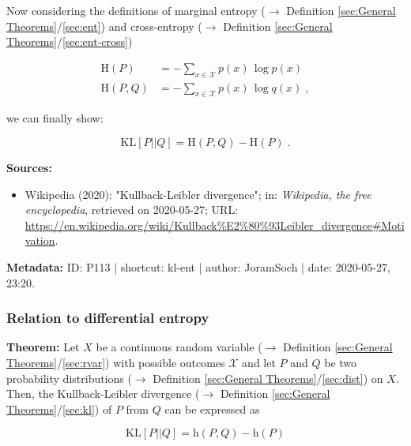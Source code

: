 \documentclass[a4paper,12pt,twoside]{book}
\begin{document}
Now considering the definitions of marginal entropy ($\rightarrow$ Definition \ref{sec:General Theorems}/\ref{sec:ent}) and cross-entropy ($\rightarrow$ Definition \ref{sec:General Theorems}/\ref{sec:ent-cross})

\begin{equation} \label{eq:kl-ent-ME-CE}
\begin{split}
\mathrm{H}(P) &= - \sum_{x \in \mathcal{X}} p(x) \, \log p(x) \\
\mathrm{H}(P,Q) &= - \sum_{x \in \mathcal{X}} p(x) \, \log q(x) \; ,
\end{split}
\end{equation}

we can finally show:

\begin{equation} \label{eq:kl-ent-KL-qed}
\mathrm{KL}[P||Q] = \mathrm{H}(P,Q) - \mathrm{H}(P) \; .
\end{equation}


\vspace{1em}
\textbf{Sources:}
\begin{itemize}
\item Wikipedia (2020): "Kullback-Leibler divergence"; in: \textit{Wikipedia, the free encyclopedia}, retrieved on 2020-05-27; URL: \url{https://en.wikipedia.org/wiki/Kullback%E2%80%93Leibler_divergence#Motivation}.
\end{itemize}


\vspace{1em}
\textbf{Metadata:} ID: P113 | shortcut: kl-ent | author: JoramSoch | date: 2020-05-27, 23:20.
\vspace{1em}



\subsubsection[\textbf{Relation to differential entropy}]{Relation to differential entropy} \label{sec:kl-dent}
\setcounter{equation}{0}

\textbf{Theorem:} Let $X$ be a continuous random variable ($\rightarrow$ Definition \ref{sec:General Theorems}/\ref{sec:rvar}) with possible outcomes $\mathcal{X}$ and let $P$ and $Q$ be two probability distributions ($\rightarrow$ Definition \ref{sec:General Theorems}/\ref{sec:dist}) on $X$. Then, the Kullback-Leibler divergence ($\rightarrow$ Definition \ref{sec:General Theorems}/\ref{sec:kl}) of $P$ from $Q$ can be expressed as

\begin{equation} \label{eq:kl-dent-kl-dent}
\mathrm{KL}[P||Q] = \mathrm{h}(P,Q) - \mathrm{h}(P)
\end{equation}
\end{document}

